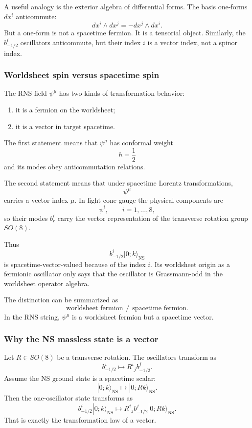 \documentclass[
  10pt,
  a4paper,
  openany]{book}
\providecommand{\tightlist}{%
  \setlength{\itemsep}{0pt}\setlength{\parskip}{0pt}}
\begin{document}
A useful analogy is the exterior algebra of differential forms. The
basis one-forms \(dx^i\) anticommute: \[
dx^i\wedge dx^j=-dx^j\wedge dx^i.
\] But a one-form is not a spacetime fermion. It is a tensorial object.
Similarly, the \(b_{-1/2}^i\) oscillators anticommute, but their index
\(i\) is a vector index, not a spinor index.

\subsubsection{Worldsheet spin versus spacetime
spin}\label{worldsheet-spin-versus-spacetime-spin}

The RNS field \(\psi^\mu\) has two kinds of transformation behavior:

\begin{enumerate}
\def\labelenumi{\arabic{enumi}.}
\tightlist
\item
  it is a fermion on the worldsheet;
\item
  it is a vector in target spacetime.
\end{enumerate}

The first statement means that \(\psi^\mu\) has conformal weight \[
h=\frac{1}{2}
\] and its modes obey anticommutation relations.

The second statement means that under spacetime Lorentz transformations,
\[
\psi^\mu
\] carries a vector index \(\mu\). In light-cone gauge the physical
components are \[
\psi^i,
\qquad
i=1,\dots,8,
\] so their modes \(b_r^i\) carry the vector representation of the
transverse rotation group \(SO(8)\).

Thus \[
b_{-1/2}^i|0;k\rangle_{\text{NS}}
\] is spacetime-vector-valued because of the index \(i\). Its worldsheet
origin as a fermionic oscillator only says that the oscillator is
Grassmann-odd in the worldsheet operator algebra.

The distinction can be summarized as \[
\boxed{
\text{worldsheet fermion}
\neq
\text{spacetime fermion}.
}
\] In the RNS string, \(\psi^\mu\) is a worldsheet fermion but a
spacetime vector.

\subsubsection{Why the NS massless state is a
vector}\label{why-the-ns-massless-state-is-a-vector}

Let \(R\in SO(8)\) be a transverse rotation. The oscillators transform
as \[
b_{-1/2}^i
\longmapsto
R^i{}_j b_{-1/2}^j.
\] Assume the NS ground state is a spacetime scalar: \[
|0;k\rangle_{\text{NS}}
\longmapsto
|0;Rk\rangle_{\text{NS}}.
\] Then the one-oscillator state transforms as \[
b_{-1/2}^i|0;k\rangle_{\text{NS}}
\longmapsto
R^i{}_j b_{-1/2}^j|0;Rk\rangle_{\text{NS}}.
\] That is exactly the transformation law of a vector.
\end{document}
